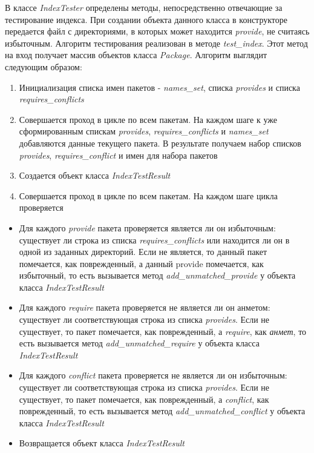 В классе \textit{IndexTester} определены методы, непосредственно отвечающие за тестирование
индекса. При создании объекта данного класса в конструкторе передается файл с директориями,
в которых может находится \textit{provide}, не считаясь избыточным. 
Алгоритм тестирования реализован в методе \textit{test\_index}. Этот метод на вход
получает массив объектов класса \textit{Package}. Алгоритм выглядит следующим образом:
\begin{enumerate}
\item{Инициализация списка имен пакетов - \textit{names\_set}, списка \textit{provides} и 
списка \textit{requires\_conflicts}}
\item{Совершается проход в цикле по всем пакетам. На каждом шаге 
к уже сформированным спискам \textit{provides}, \textit{requires\_conflicts} и \textit{names\_set} 
добавляются данные текущего пакета. В результате получаем набор списков \textit{provides}, 
\textit{requires\_conflict} и имен для набора пакетов}
\item{Создается объект класса \textit{IndexTestResult}}
\item{Совершается проход в цикле по всем пакетам. На каждом шаге цикла проверяется}
\end{enumerate}
\begin{itemize}
	\item{Для каждого \textit{provide} пакета проверяется является ли он избыточным: существует ли
	строка из списка \textit{requires\_conflicts} или находится ли он в одной из заданных директорий.
	Если не является, то данный пакет помечается, как поврежденный, а данный provide помечается,
	как избыточный, то есть вызывается метод \emph{add\_unmatched\_provide} у объекта класса \textit{IndexTestResult}}
	\item{Для каждого \textit{require} пакета проверяется не является ли он анметом: существует ли
	соответствующая строка из списка \textit{provides}. Если не существует, то пакет помечается, как 
	поврежденный, а \textit{require}, как \textit{анмет}, то есть вызывается метод \textit{add\_unmatched\_require}
	у объекта класса \textit{IndexTestResult}}
	\item{Для каждого \textit{conflict} пакета проверяется не является ли он избыточным: существует ли
	соответствующая строка из списка \textit{provides}. Если не существует, то пакет помечается, как 
	поврежденный, а \textit{conflict}, как поврежденный, то есть вызывается метод \textit{add\_unmatched\_conflict}
	у объекта класса \textit{IndexTestResult}}
	\item{Возвращается объект класса \textit{IndexTestResult}}
\end{itemize}

